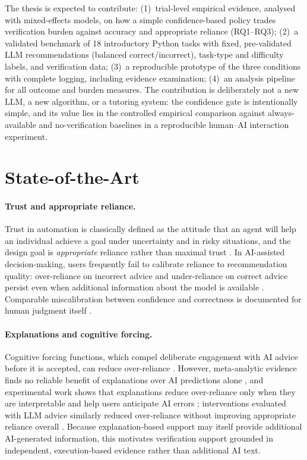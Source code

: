 \documentclass[oneside,final,14pt,a4paper]{extreport}
\begin{document}
The thesis is expected to contribute: (1)~trial-level empirical evidence,
analysed with mixed-effects models, on how a simple confidence-based policy
trades verification burden against accuracy and appropriate reliance
(RQ1--RQ3); (2)~a validated benchmark of 18 introductory Python tasks with
fixed, pre-validated LLM recommendations (balanced correct/incorrect),
task-type and difficulty labels, and verification data; (3)~a reproducible
prototype of the three conditions with complete logging, including evidence
examination; (4)~an analysis pipeline for all outcome and burden measures.
The contribution is deliberately not a new LLM, a new algorithm, or a
tutoring system: the confidence gate is intentionally simple, and its value
lies in the controlled empirical comparison against always-available and
no-verification baselines in a reproducible human--AI interaction experiment.

\section{State-of-the-Art}

\paragraph{Trust and appropriate reliance.}
Trust in automation is classically defined as the attitude that an agent will
help an individual achieve a goal under uncertainty and in risky situations,
and the design goal is \emph{appropriate} reliance rather than maximal trust
\cite{LeeSee2004}. In AI-assisted decision-making, users frequently fail to
calibrate reliance to recommendation quality: over-reliance on incorrect
advice and under-reliance on correct advice persist even when additional
information about the model is available
\cite{PoursabziSangdeh2021,Chen2023}. Comparable miscalibration between
confidence and correctness is documented for human judgment itself
\cite{KrugerDunning1999}.

\paragraph{Explanations and cognitive forcing.}
Cognitive forcing functions, which compel deliberate engagement with AI
advice before it is accepted, can reduce over-reliance \cite{Bucinca2021}.
However, meta-analytic evidence finds no reliable benefit of explanations
over AI predictions alone \cite{Schemmer2022}, and experimental work shows
that explanations reduce over-reliance only when they are interpretable and
help users anticipate AI errors \cite{Vasconcelos2022}; interventions
evaluated with LLM advice similarly reduced over-reliance without improving
appropriate reliance overall \cite{Bo2025}. Because explanation-based
support may itself provide additional AI-generated information, this
motivates verification support grounded in independent, execution-based
evidence rather than additional AI text.
\end{document}
